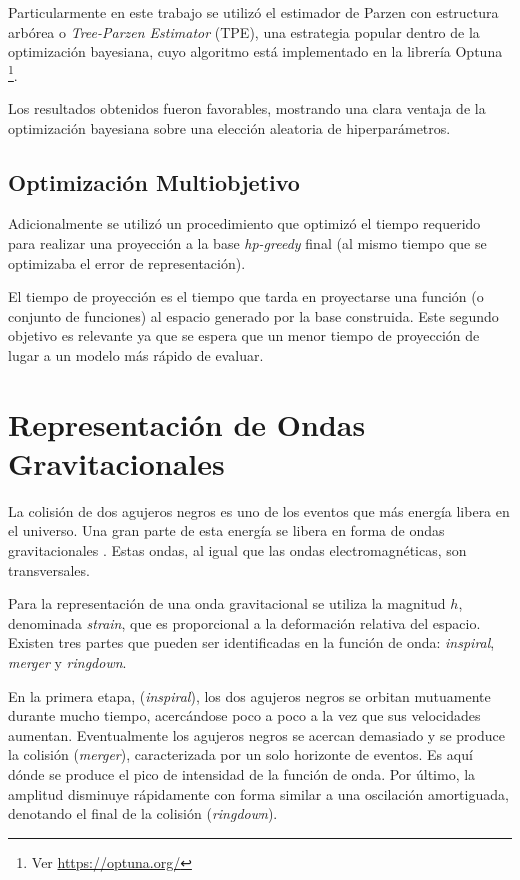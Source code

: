 Particularmente en este trabajo se utilizó el estimador de Parzen con estructura arbórea o \textit{Tree-Parzen Estimator} (TPE), una estrategia popular dentro de la optimización bayesiana, cuyo algoritmo está implementado en la librería Optuna \cite{optuna_2019} \footnote{Ver \url{https://optuna.org/}}. 


Los resultados obtenidos fueron favorables, mostrando una clara ventaja de la optimización bayesiana sobre una elección aleatoria de hiperparámetros.

\subsection*{Optimización Multiobjetivo}

Adicionalmente se utilizó un procedimiento que optimizó el tiempo requerido para realizar una proyección a la base \textit{hp-greedy} final (al mismo tiempo que se optimizaba el error de representación).

El tiempo de proyección es el tiempo que tarda en proyectarse una función (o conjunto de funciones) al espacio generado por la base construida. Este segundo objetivo es relevante ya que se espera que un menor tiempo de proyección de lugar a un modelo más rápido de evaluar.





\section{Representación de Ondas Gravitacionales}

La colisión de dos agujeros negros es uno de los eventos que más energía libera en el universo. Una gran parte de esta energía se libera en forma de ondas gravitacionales \cite{Centrella_2010}. Estas ondas, al igual que las ondas electromagnéticas, son transversales.

Para la representación de una onda gravitacional se utiliza la magnitud $h$, denominada \textit{strain}, que es proporcional a la deformación relativa del espacio. Existen tres partes que pueden ser identificadas en la función de onda: \textit{inspiral}, \textit{merger} y \textit{ringdown}. 

En la primera etapa, (\textit{inspiral}), los dos agujeros negros se orbitan mutuamente durante mucho tiempo, acercándose poco a poco a la vez que sus velocidades aumentan. Eventualmente los agujeros negros se acercan demasiado y se produce la colisión (\textit{merger}), caracterizada por un solo horizonte de eventos. Es aquí dónde se produce el pico de intensidad de la función de onda. Por último, la amplitud disminuye rápidamente con forma similar a una oscilación amortiguada, denotando el final de la colisión (\textit{ringdown}).

